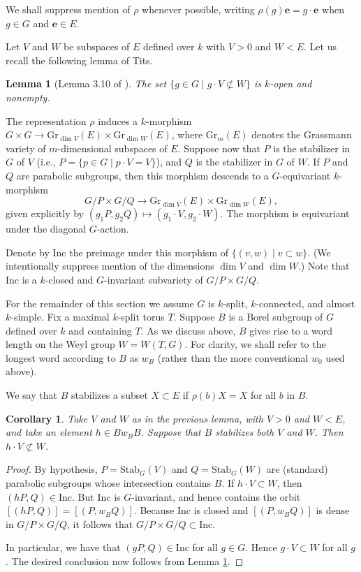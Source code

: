 \documentclass{amsart}
\theoremstyle{plain}
\newtheorem{lemma}[theorem]{Lemma}
\newtheorem{corollary}[theorem]{Corollary}
\theoremstyle{definition}
\theoremstyle{remark}
\newcommand{\Vect}[1]{\mathbold{#1}}
\begin{document}
We shall suppress mention of $\rho$ whenever possible, writing $\rho(g) \Vect{e} = g\cdot
\Vect{e}$ when $g \in G$ and $\Vect{e} \in E$.

Let $V$ and $W$ be subspaces of $E$ defined over $k$ with $V > 0$ and $ W < E$. Let us
recall the following lemma of Tits.

\begin{lemma}[Lemma 3.10 of \cite{MR44:4105}]\label{lem:tits}
The set $\{g \in G \mid g\cdot V \not\subset W\}$
is $k$-open and nonempty.
\end{lemma}

The representation $\rho$
induces a $k$-morphism $G \times G \to \mathrm{Gr}_{\dim V}(E) \times \mathrm{Gr}_{\dim W}(E)$,
where
$\mathrm{Gr}_{m}(E)$ denotes the Grassmann variety of $m$-dimen\-sional subspaces of $E$.
Suppose now that $P$ is the stabilizer in $G$ of $V$ (i.e., $P = \{p \in G \mid
p \cdot V = V\}$), and $Q$ is the stabilizer in $G$ of $W$. If $P$ and $Q$
are parabolic subgroups, then this morphism descends to a $G$-equivariant $k$-morphism
$$G/P \times G/Q \to \mathrm{Gr}_{\dim V}(E) \times \mathrm{Gr}_{\dim W}(E),$$
given explicitly by $(g_{1}P, g_{2}Q) \mapsto (g_{1}\cdot V, g_{2}\cdot W)$. The
morphism is equivariant under the diagonal $G$-action.

Denote by $\mathrm{Inc}$ the
preimage under this morphism of $\{(v,w) \mid v \subset w\}$.
(We intentionally suppress mention of the dimensions $\dim V$ and $\dim W$.)
Note that $\mathrm{Inc}$ is a $k$-closed and $G$-invariant subvariety of $G/P \times
G/Q$.

For the remainder of this section we assume $G$ is $k$-split, $k$-connected, and almost $k$-simple.
Fix a maximal $k$-split torus $T$. Suppose $B$ is a
Borel subgroup of $G$ defined over $k$ and containing $T$. As we discuss above,
$B$ gives rise to a word length on the Weyl group $W =
W(T, G)$. For clarity, we shall refer to the longest word according to $B$ as $w_{B}$
(rather than the more conventional $w_{0}$ used above).

We say that $B$ stabilizes a subset $X \subset E$ if $\rho(b)X = X$ for all $b$ in $B$.

\begin{corollary}\label{cor:opencell}
Take $V$ and $W$ as in the previous lemma, with $V > 0$ and $ W < E$, and take an element $h \in Bw_{B}B$.
Suppose that $B$ stabilizes both $V$ and $W$. Then
$h\cdot V \not\subset W$.
\end{corollary}
\begin{proof}
By hypothesis, $P = \mathrm{Stab}_{G}(V)$ and $Q = \mathrm{Stab}_{G}(W)$ are (standard)
parabolic subgroups whose intersection contains $B$. If $h\cdot V \subset W$, then
$(hP, Q) \in \mathrm{Inc}$. But $\mathrm{Inc}$ is $G$-invariant, and hence contains the
orbit $[(hP, Q)]=[(P, w_{B}Q)]$. Because $\mathrm{Inc}$ is closed and $[(P, w_{B}Q)]$ is
dense in $G/P \times G/Q$, it follows that $G/P \times G/Q  \subset \mathrm{Inc}$.

In particular, we have that $(gP, Q) \in \mathrm{Inc}$ for all $g \in G$. Hence $g\cdot
V \subset W$ for all $g$. The desired conclusion now follows from Lemma \ref{lem:tits}.
\end{proof}
\end{document}
